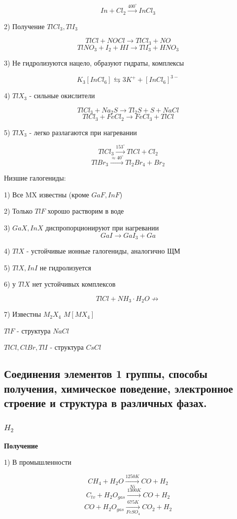 \documentclass[14pt,a4paper]{scrartcl}
\begin{document}
$$In + Cl_2 \xrightarrow{400^{\circ}} InCl_3$$

2) Получение $TlCl_3, TlI_3$

$$TlCl + NOCl \rightarrow TlCl_3 + NO$$
$$TlNO_3 + I_2 + HI \rightarrow TlI_3 + HNO_3$$

3) Не гидролизуются нацело, образуют гидраты, комплексы

$$K_3[InCl_6] \leftrightarrows 3K^+ + [InCl_6]^{3-}$$

4) $TlX_3$ - сильные окислители

$$TlCl_3 + Na_2S \rightarrow Tl_2S + S + NaCl$$
$$TlCl_3 + FeCl_2 \rightarrow FeCl_3 + TlCl$$

5) $TlX_3$ - легко разлагаются при нагревании

$$TlCl_3 \xrightarrow{153^{\circ}} TlCl + Cl_2$$
$$TlBr_3 \xrightarrow{\approx 40^{\circ}} Tl_2Br_4 + Br_2$$

Низшие галогениды:

1) Все MX известны (кроме $GaF, InF$)

2) Только $TlF$ хорошо растворим в воде

3) $GaX, InX$ диспропорционируют при нагревании
$$GaI \rightarrow GaI_3 + Ga$$

4) $TlX$ - устойчивые ионные галогениды, аналогично ЩМ

5) $TlX, InI$ не гидролизуется

6) у $TlX$ нет устойчивых комплексов

$$TlCl + NH_3\cdot H_2O \nrightarrow$$

7) Известны $M_2X_4$ $M[MX_4]$

$TlF$ - структура $NaCl$

$TlCl, ClBr, TlI$ - структура $CsCl$

\subsection{Соединения элементов 1 группы, способы получения, химическое поведение, электронное строение и структура в различных фазах.}

\subsubsection{$H_2$}

\textbf{Получение}

1) В промышленности

$$CH_4 + H_2O \xrightarrow[Ni]{1250K} CO + H_2$$
$$C_{tv} + H_2O_{gas} \xrightarrow{1300K} CO + H_2$$
$$CO + H_2O_{gas} \xrightarrow[FeSO_4]{675K} CO_2 + H_2$$
\end{document}
